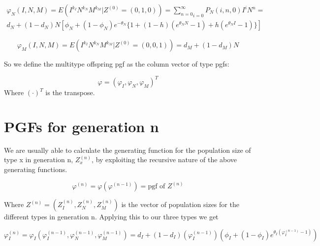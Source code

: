 \documentclass[12pt]{article}
\begin{document}
\begin{multline}
    \varphi_N(I,N,M) =E(I^{k_I} N^{k_N} M^{k_M}|Z^{(0)}=(0,1,0)) = \underset{i=0}{\sum \limits_{n=0} ^ \infty} P_N(i,n,0) I^i N^n = \\
    d_N +(1-d_N)N[\phi_N +(1-\phi_N)e^{-\theta_N} \{ 1 +
    (1-h)(e^{\theta_N N}-1)+ 
    h(e^{\theta_N I}-1)\}]
\end{multline}

\begin{equation}
    \varphi_M(I,N,M) =E(I^{k_I} N^{k_N} M^{k_M}|Z^{(0)}=(0,0,1)) = d_M + (1-d_M)N
\end{equation}

So we define the multitype offspring pgf as the column vector of type pgfs:

\begin{equation}
    \varphi = (\varphi_I, \varphi_N,\varphi_M)^T
\end{equation}
Where $(\cdot)^T$ is the transpose. 


\section{PGFs for generation n}

We are usually able to calculate the generating function for the population size of type x  in generation n, $Z_x^{(n)}$,  by exploiting the recursive nature of the above generating functions.

\begin{equation}
    \varphi^{(n)} = \varphi(\varphi^{(n-1)}) = \mbox{pgf of }Z^{(n)}
\end{equation}

Where $Z^{(n)}=(Z_I^{(n)},Z_N^{(n)},Z_M^{(n)})$ is the vector of population sizes for the different types in generation n. Applying this to our three types we get

\begin{equation}
    \varphi_I^{(n)} = \varphi_I(\varphi_I^{(n-1)}, \varphi_N^{(n-1)}, \varphi_M^{(n-1)}) = d_I +(1-d_I)(\varphi_I^{(n-1)})(\phi_I + (1-\phi_I)e^{\theta_I (\varphi_I^{(n-1)} -1)})
\end{equation}
\end{document}
